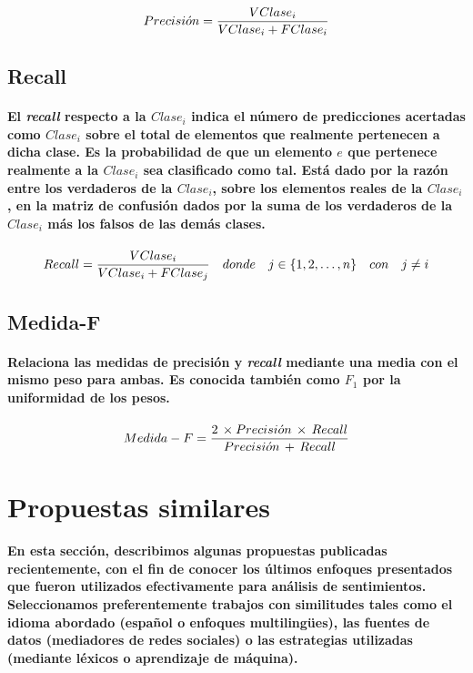 \paragraph{
$$ Precisi\acute{o}n = {V Clase_i \over V Clase_i + F Clase_i} $$ }
\subsection{Recall}
\paragraph{El \textit{recall} respecto a la $Clase_i$ indica el n\'umero de predicciones acertadas como $Clase_i$ sobre el total de elementos que realmente pertenecen a dicha clase. Es la probabilidad de que un elemento $e$ que pertenece realmente a la $Clase_i$ sea clasificado como tal. Est\'a dado por la raz\'on entre los verdaderos de la $Clase_i$, sobre los elementos reales de la $Clase_i$, en la matriz de confusi\'on dados por la suma de los verdaderos de la $Clase_i$ m\'as los falsos de las dem\'as clases.}
\paragraph{
$$ Recall = { V Clase_i \over V Clase_i + F Clase_j } \quad donde \quad j \in \lbrace 1,2,\dots,n \rbrace \quad con \quad j \ne i $$ }
\subsection{Medida-F}
\paragraph{Relaciona las medidas de precisi\'on y \textit{recall} mediante una media con el mismo peso para ambas. Es conocida tambi\'en como $F_1$ por la uniformidad de los pesos.}
\paragraph{
$$ Medida-F = {2 \, \times Precisi\acute{o}n \, \times \, Recall \over Precisi\acute{o}n \, + \, Recall}$$ }



\section{Propuestas similares}
\paragraph{En esta secci\'on, describimos algunas propuestas publicadas recientemente, con el fin de conocer los \'ultimos enfoques presentados que fueron utilizados efectivamente para an\'alisis de sentimientos. Seleccionamos preferentemente trabajos con similitudes tales como el idioma abordado (espa\~nol o enfoques multiling\"ues), las fuentes de datos (mediadores de redes sociales) o las estrategias utilizadas (mediante l\'exicos o aprendizaje de m\'aquina).}

